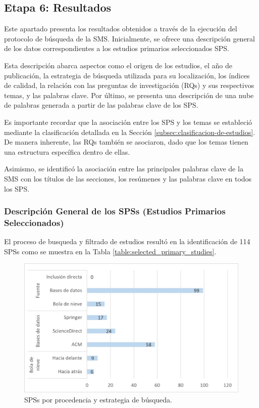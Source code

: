 \subsection{Etapa 6: Resultados}
Este apartado presenta los resultados obtenidos a través de la ejecución del protocolo de búsqueda de la SMS. Inicialmente, se ofrece una descripción general de los datos correspondientes a los estudios primarios seleccionados SPS.

Esta descripción abarca aspectos como el origen de los estudios, el año de publicación, la estrategia de búsqueda utilizada para su localización, los índices de calidad, la relación con las preguntas de investigación (RQs) y sus respectivos temas, y las palabras clave. Por último, se presenta una descripción de una nube de palabras generada a partir de las palabras clave de los SPS.

Es importante recordar que la asociación entre los SPS y los temas se estableció mediante la clasificación detallada en la Sección \ref{subsec:clasificacion-de-estudios}. De manera inherente, las RQs también se asociaron, dado que los temas tienen una estructura específica dentro de ellas.

Asimismo, se identificó la asociación entre las principales palabras clave de la SMS con los títulos de las secciones, los resúmenes y las palabras clave en todos los SPS.

\subsubsection{Descripción General de los SPSs (Estudios Primarios Seleccionados)}
El proceso de busqueda y filtrado de estudios resultó en la identificación de 114 SPSs como se muestra en la Tabla \ref{table:selected_primary_studies}.

\begin{figure}[htbp]
	\centering
	\vspace{10pt}
	\includegraphics[scale=0.7]{resources/figures/SPSsByProcedence.jpg}
	\vspace{6pt}
	\caption{SPSs por procedencia y estrategia de búsqueda.}
	\label{fig:SPSsByProcedence}
\end{figure}


